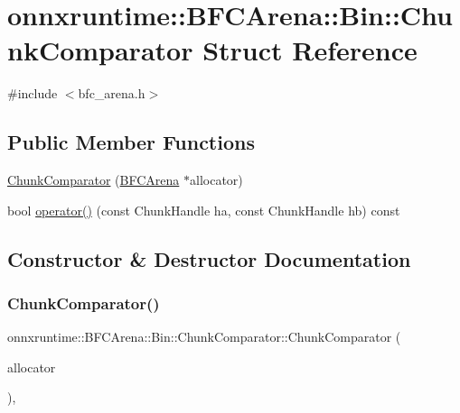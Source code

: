 \hypertarget{structonnxruntime_1_1BFCArena_1_1Bin_1_1ChunkComparator}{}\section{onnxruntime\+:\+:B\+F\+C\+Arena\+:\+:Bin\+:\+:Chunk\+Comparator Struct Reference}
\label{structonnxruntime_1_1BFCArena_1_1Bin_1_1ChunkComparator}


{\ttfamily \#include $<$bfc\+\_\+arena.\+h$>$}

\subsection*{Public Member Functions}
\begin{DoxyCompactItemize}
\item 
\mbox{\hyperlink{structonnxruntime_1_1BFCArena_1_1Bin_1_1ChunkComparator_a075451c805d7ad188b3f8eb2aa79ccf3}{Chunk\+Comparator}} (\mbox{\hyperlink{classonnxruntime_1_1BFCArena}{B\+F\+C\+Arena}} $\ast$allocator)
\item 
bool \mbox{\hyperlink{structonnxruntime_1_1BFCArena_1_1Bin_1_1ChunkComparator_a7200d54983c024e6b14811807e8e259b}{operator()}} (const Chunk\+Handle ha, const Chunk\+Handle hb) const
\end{DoxyCompactItemize}


\subsection{Constructor \& Destructor Documentation}
\mbox{\label{structonnxruntime_1_1BFCArena_1_1Bin_1_1ChunkComparator_a075451c805d7ad188b3f8eb2aa79ccf3}} 
\subsubsection{\texorpdfstring{Chunk\+Comparator()}{ChunkComparator()}}
{\footnotesize\ttfamily onnxruntime\+::\+B\+F\+C\+Arena\+::\+Bin\+::\+Chunk\+Comparator\+::\+Chunk\+Comparator (\begin{DoxyParamCaption}\item[{\mbox{\hyperlink{classonnxruntime_1_1BFCArena}{B\+F\+C\+Arena}} $\ast$}]{allocator }\end{DoxyParamCaption})\hspace{0.3cm}{\ttfamily [inline]}, {\ttfamily [explicit]}}



